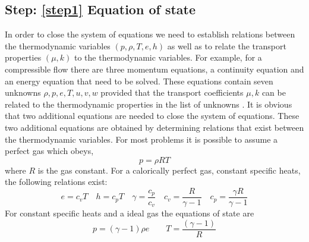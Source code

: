 \documentclass[fleqn]{article}
\begin{document}
\subsection{Step: \ref{step1}  \textsf{Equation of state}}
In order to close the system of equations we need to establish relations
between the thermodynamic variables $(p, \rho, T, e, h)$ as well as to
relate the transport properties $(\mu,k)$ to the thermodynamic variables.
For example, for a compressible flow there are three momentum equations,
a continuity equation and an energy equation that need to be solved.
These equations contain seven unknowns $\rho, p, e, T, u, v, w$ provided
that the transport coefficients $\mu,k$ can be related to the thermodynamic
properties in the list of unknowns .  It is obvious that
two additional equations are needed to close the system of equations.
These two additional equations are obtained by determining relations that
exist between the thermodynamic variables.  For most problems it is possible
to assume a perfect gas which obeys,
%
%
\begin{equation}
    p = \rho R T
\end{equation}
%
%
where $R$ is the gas constant.  For a calorically perfect gas, constant
specific heats, the following relations exist:
%
%
\begin{equation}
    e = c_v T \quad h = c_pT \quad \gamma = \frac{c_p}{c_v} \quad c_v = \frac{R}{\gamma -1} \quad c_p = \frac{\gamma R}{\gamma -1}
\end{equation}
For constant specific heats and a ideal gas the equations of state are
\begin{equation}
p = (\gamma - 1) \rho e \quad \quad T = \frac{(\gamma - 1)}{R}
\end{equation}
%
%
%
%
\end{document}
